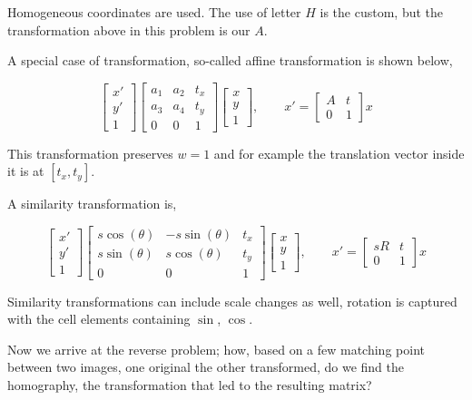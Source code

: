 \documentclass{article}
\begin{document}
Homogeneous coordinates are used. The use of letter $H$ is the custom, but the
transformation above in this problem is our $A$.

A special case of transformation, so-called affine transformation is shown
below,

$$ 
\left[\begin{array}{r} x' \\ y' \\ 1 \end{array}\right]
\left[\begin{array}{rrr}
a_1 & a_2 & t_x \\ a_3 & a_4 & t_y \\ 0 & 0 & 1
\end{array}\right]
\left[\begin{array}{r} x \\ y \\ 1 \end{array}\right],
\qquad
x' = \left[\begin{array}{rr} A & t \\ 0 & 1 \end{array}\right] x
$$

This transformation preserves $w = 1$ and for example the translation vector
inside it is at $[t_x, t_y]$.

A similarity transformation is,

$$ 
\left[\begin{array}{r} x' \\ y' \\ 1 \end{array}\right]
\left[\begin{array}{rrr}
s\cos(\theta) & -s\sin(\theta) & t_x \\ 
s\sin(\theta) & s\cos(\theta) & t_y \\ 
0 & 0 & 1
\end{array}\right]
\left[\begin{array}{r} x \\ y \\ 1 \end{array}\right],
\qquad
x' = \left[\begin{array}{rr}
sR & t \\ 0 & 1
\end{array}\right] x
$$

Similarity transformations can include scale changes as well, rotation is
captured with the cell elements containing $\sin$, $\cos$.

Now we arrive at the reverse problem; how, based on a few matching point between
two images, one original the other transformed, do we find the homography, the
transformation that led to the resulting matrix?
\end{document}
